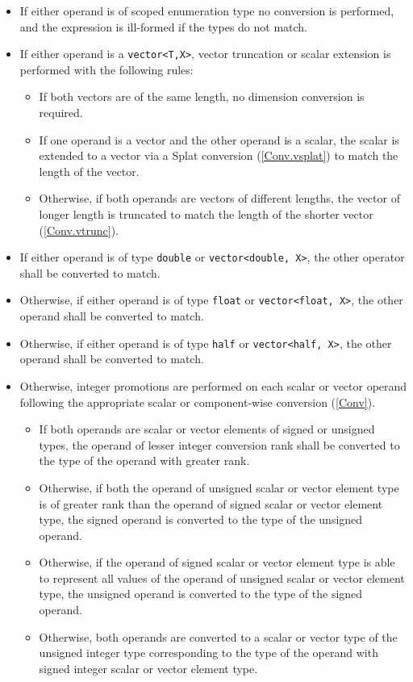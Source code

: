 \begin{itemize}
  \item If either operand is of scoped enumeration type no conversion is
  performed, and the expression is ill-formed if the types do not match.
  \item If either operand is a \texttt{vector<T,X>}, vector truncation or scalar
  extension is performed with the following rules:
  \begin{itemize}
    \item If both vectors are of the same length, no dimension conversion is
    required.
    \item If one operand is a vector and the other operand is a scalar, the
    scalar is extended to a vector via a Splat conversion (\ref{Conv.vsplat}) to
    match the length of the vector.
    \item Otherwise, if both operands are vectors of different lengths, the
    vector of longer length is truncated to match the length of the shorter
    vector (\ref{Conv.vtrunc}).
  \end{itemize}
  \item If either operand is of type \texttt{double} or \texttt{vector<double,
  X>}, the other operator shall be converted to match.
  \item Otherwise, if either operand is of type \texttt{float} or \texttt{vector<float,
  X>}, the other operand shall be converted to match.
  \item Otherwise, if either operand is of type \texttt{half} or \texttt{vector<half, X>},
  the other operand shall be converted to match.
  \item Otherwise, integer promotions are performed on each scalar or vector
  operand following the appropriate scalar or component-wise conversion
  (\ref{Conv}).
  \begin{itemize}
    \item If both operands are scalar or vector elements of signed or unsigned
    types, the operand of lesser integer conversion rank shall be converted to
    the type of the operand with greater rank.
    \item Otherwise, if both the operand of unsigned scalar or vector element
    type is of greater rank than the operand of signed scalar or vector element
    type, the signed operand is converted to the type of the unsigned operand.
    \item Otherwise, if the operand of signed scalar or vector element type is
    able to represent all values of the operand of unsigned scalar or vector
    element type, the unsigned operand is converted to the type of the signed
    operand.
    \item Otherwise, both operands are converted to a scalar or vector type of
    the unsigned integer type corresponding to the type of the operand with
    signed integer scalar or vector element type.
  \end{itemize}
\end{itemize}

